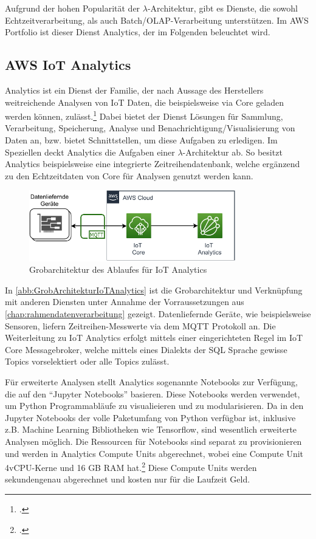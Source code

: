 Aufgrund der hohen Popularität der $\lambda$-Architektur, gibt es Dienste, die sowohl Echtzeitverarbeitung, als auch Batch/\ac{OLAP}-Verarbeitung unterstützen. Im \ac{AWS} Portfolio ist dieser Dienst \AWSIOT{} Analytics, der im Folgenden beleuchtet wird.

\subsection{AWS IoT Analytics} \label{productselection:iotanalytics}
\AWSIOT{} Analytics ist ein Dienst der \AWSIOT{} Familie, der nach Aussage des Herstellers weitreichende Analysen von \ac{IoT} Daten, die beispielsweise via \AWSIOT{} Core geladen werden können, zulässt.\footcite[Vgl. auch im Folgenden][]{AmazonWebServicesInc..o.J.c} Dabei bietet der Dienst Lösungen für Sammlung, Verarbeitung, Speicherung, Analyse und Benachrichtigung/Visualisierung von Daten an, bzw. bietet Schnittstellen, um diese Aufgaben zu erledigen. Im Speziellen deckt \AWSIOT{} Analytics die Aufgaben einer $\lambda$-Architektur ab. So besitzt \AWSIOT{} Analytics beispielsweise eine integrierte Zeitreihendatenbank, welche ergänzend zu den Echtzeitdaten von \AWSIOT{} Core für Analysen genutzt werden kann.
\begin{figure}[H]
\centering
\includegraphics[width=0.8\textwidth]{graphics/IoT-Analytics-general.pdf}
\caption{Grobarchitektur des Ablaufes für IoT Analytics}
\label{abb:GrobArchitekturIoTAnalytics}
\end{figure}
In \autoref{abb:GrobArchitekturIoTAnalytics} ist die Grobarchitektur und Verknüpfung mit anderen Diensten unter Annahme der Vorraussetzungen aus \autoref{chap:rahmendatenverarbeitung} gezeigt. Datenliefernde Geräte, wie beispielsweise Sensoren, liefern Zeitreihen-Messwerte via dem \ac{MQTT} Protokoll an. Die Weiterleitung zu IoT Analytics erfolgt mittels einer eingerichteten Regel im \ac{IoT} Core Messagebroker, welche mittels eines Dialekts der \ac{SQL} Sprache gewisse Topics vorselektiert oder alle Topics zulässt.


Für erweiterte Analysen stellt \AWSIOT{} Analytics sogenannte Notebooks zur Verfügung, die auf den \enquote{Jupyter Notebooks} basieren. Diese Notebooks werden verwendet, um Python Programmabläufe zu visualieieren und zu modularisieren. Da in den Jupyter Notebooks der volle Paketumfang von Python verfügbar ist, inklusive z.B. Machine Learning Bibliotheken wie Tensorflow, sind wesentlich erweiterte Analysen möglich. Die Ressourcen für Notebooks sind separat zu provisionieren und werden in Analytics Compute Units abgerechnet, wobei eine Compute Unit 4vCPU-Kerne und 16 GB \ac{RAM} hat.\footcite[Vgl.][]{AmazonWebServicesInc..o.J.i} Diese Compute Units werden sekundengenau abgerechnet und kosten nur für die Laufzeit Geld.

